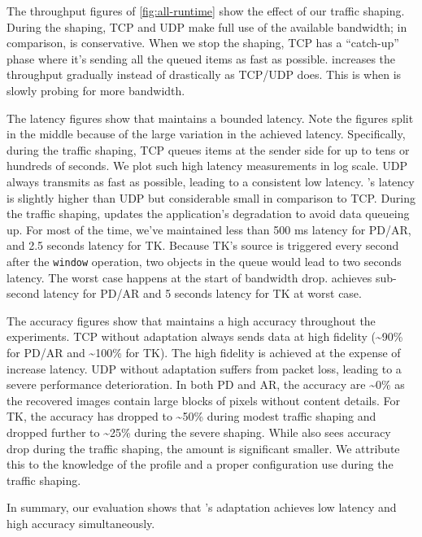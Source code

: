 The throughput figures of \autoref{fig:all-runtime} show the effect of our
traffic shaping. During the shaping, TCP and UDP make full use of the available
bandwidth; in comparison, \sysname{} is conservative. When we stop the shaping,
TCP has a ``catch-up'' phase where it's sending all the queued items as fast as
possible. \sysname{} increases the throughput gradually instead of drastically
as TCP/UDP does. This is when \sysname{} is slowly probing for more bandwidth.

The latency figures show that \sysname{} maintains a bounded latency. Note the
figures split in the middle because of the large variation in the achieved
latency. Specifically, during the traffic shaping, TCP queues items at the
sender side for up to tens or hundreds of seconds. We plot such high latency
measurements in log scale. UDP always transmits as fast as possible, leading to
a consistent low latency. \sysname{}'s latency is slightly higher than UDP but
considerable small in comparison to TCP. During the traffic shaping, \sysname{}
updates the application's degradation to avoid data queueing up. For most of the
time, we've maintained less than 500 ms latency for PD/AR, and 2.5 seconds
latency for TK. Because TK's source is triggered every second after the
\texttt{window} operation, two objects in the queue would lead to two seconds
latency. The worst case happens at the start of bandwidth drop. \sysname{}
achieves sub-second latency for PD/AR and 5 seconds latency for TK at worst
case.

The accuracy figures show that \sysname{} maintains a high accuracy throughout
the experiments. TCP without adaptation always sends data at high fidelity
(\textasciitilde 90\% for PD/AR and \textasciitilde 100\% for TK). The high
fidelity is achieved at the expense of increase latency. UDP without adaptation
suffers from packet loss, leading to a severe performance deterioration.  In
both PD and AR, the accuracy are \textasciitilde 0\% as the recovered images
contain large blocks of pixels without content details. For TK, the accuracy has
dropped to \textasciitilde 50\% during modest traffic shaping and dropped
further to \textasciitilde 25\% during the severe shaping. While \sysname{} also
sees accuracy drop during the traffic shaping, the amount is significant
smaller. We attribute this to the knowledge of the profile and a proper
configuration use during the traffic shaping.

In summary, our evaluation shows that \sysname{}'s adaptation achieves low
latency and high accuracy simultaneously.

